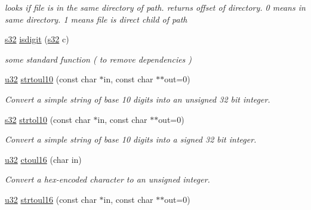 \begin{DoxyCompactItemize}
\begin{DoxyCompactList}\small\item\em looks if file is in the same directory of path. returns offset of directory. 0 means in same directory. 1 means file is direct child of path \end{DoxyCompactList}\item 
\mbox{\label{namespaceirr_1_1core_ac7f1fc1c7eb3f8291b8a044214823070}} 
\hyperlink{namespaceirr_ac66849b7a6ed16e30ebede579f9b47c6}{s32} \hyperlink{namespaceirr_1_1core_ac7f1fc1c7eb3f8291b8a044214823070}{isdigit} (\hyperlink{namespaceirr_ac66849b7a6ed16e30ebede579f9b47c6}{s32} c)
\begin{DoxyCompactList}\small\item\em some standard function ( to remove dependencies ) \end{DoxyCompactList}\item 
\hyperlink{namespaceirr_a0416a53257075833e7002efd0a18e804}{u32} \hyperlink{namespaceirr_1_1core_ae7f759b603f4caaa8471cb9bc2e23648}{strtoul10} (const char $\ast$in, const char $\ast$$\ast$out=0)
\begin{DoxyCompactList}\small\item\em Convert a simple string of base 10 digits into an unsigned 32 bit integer. \end{DoxyCompactList}\item 
\hyperlink{namespaceirr_ac66849b7a6ed16e30ebede579f9b47c6}{s32} \hyperlink{namespaceirr_1_1core_a6ff97e442233218d18acd56add48766f}{strtol10} (const char $\ast$in, const char $\ast$$\ast$out=0)
\begin{DoxyCompactList}\small\item\em Convert a simple string of base 10 digits into a signed 32 bit integer. \end{DoxyCompactList}\item 
\hyperlink{namespaceirr_a0416a53257075833e7002efd0a18e804}{u32} \hyperlink{namespaceirr_1_1core_a8b818c2189b834bffacd522ff752c3a6}{ctoul16} (char in)
\begin{DoxyCompactList}\small\item\em Convert a hex-\/encoded character to an unsigned integer. \end{DoxyCompactList}\item 
\hyperlink{namespaceirr_a0416a53257075833e7002efd0a18e804}{u32} \hyperlink{namespaceirr_1_1core_a96fa4fe7401b30c9057a0dbc7cd27c73}{strtoul16} (const char $\ast$in, const char $\ast$$\ast$out=0)
$$
\end{DoxyCompactItemize}
